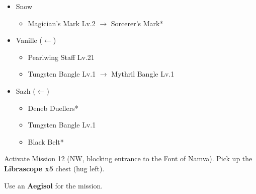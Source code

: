 \begin{menu}
\begin{itemize}
		\equip
		\begin{itemize}
			\item Snow
				\begin{itemize}
					\item Magician's Mark Lv.2 $\rightarrow$ Sorcerer's Mark*
				\end{itemize}
			\item Vanille ($\leftarrow$)
			      \begin{itemize}
				      \item Pearlwing Staff Lv.21
				      \item Tungsten Bangle Lv.1 $\rightarrow$ Mythril Bangle Lv.1
			      \end{itemize}
			\item Sazh ($\leftarrow$)
			      \begin{itemize}
				      \item Deneb Duellers*
				      \item Tungsten Bangle Lv.1
				      \item Black Belt*
			      \end{itemize}
		\end{itemize}
	\end{itemize}
\end{menu}

\renewcommand{\first}{[1] Hero's Charge (\syn/\med/\com)}
\renewcommand{\second}{[2] Tri-Disaster (\rav/\rav/\rav)}
\renewcommand{\third}{[3] Hero's Charge (\syn/\med/\com)}
\renewcommand{\fourth}{[4] Guerilla (\syn/\sab/\rav)}
\renewcommand{\fifth}{[5] Aggression (\com/\rav/\com)}
\renewcommand{\sixth}{[6] Relentless Assault (\rav/\rav/\com)}

Activate Mission 12 (NW, blocking entrance to the Font of Namva).
Pick up the \textbf{Librascope x5} chest (hug left).

Use an \textbf{Aegisol} for the mission.

